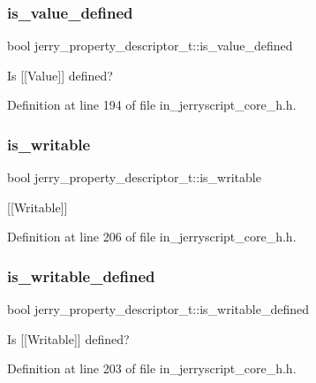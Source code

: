 \mbox{\label{structjerry__property__descriptor__t_a7244c9c53ba9ccc40d20ced22c5914e9}} 
\subsubsection{is\_value\_defined}
{\footnotesize\ttfamily bool jerry\+\_\+property\+\_\+descriptor\+\_\+t\+::is\+\_\+value\+\_\+defined}

Is [[Value]] defined? 

Definition at line 194 of file in\+\_\+jerryscript\+\_\+core\+\_\+h.\+h.

\mbox{\label{structjerry__property__descriptor__t_ae082030c18473de9856de468d4472f80}} 
\subsubsection{is\_writable}
{\footnotesize\ttfamily bool jerry\+\_\+property\+\_\+descriptor\+\_\+t\+::is\+\_\+writable}

[[Writable]] 

Definition at line 206 of file in\+\_\+jerryscript\+\_\+core\+\_\+h.\+h.

\mbox{\label{structjerry__property__descriptor__t_ac702db6b334177105052cb38c4cb8f50}} 
\subsubsection{is\_writable\_defined}
{\footnotesize\ttfamily bool jerry\+\_\+property\+\_\+descriptor\+\_\+t\+::is\+\_\+writable\+\_\+defined}

Is [[Writable]] defined? 

Definition at line 203 of file in\+\_\+jerryscript\+\_\+core\+\_\+h.\+h.

\mbox{\label{structjerry__property__descriptor__t_add7c90b99e1744e12df5856ced341be2}} 
